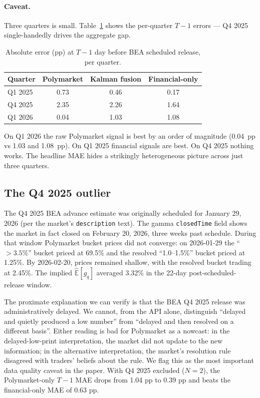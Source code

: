 \documentclass{article}
\begin{document}
\paragraph{Caveat.} Three quarters is small. Table~\ref{tab:per-q} shows the per-quarter
$T{-}1$ errors --- Q4 2025 single-handedly drives the aggregate gap.

\begin{table}[h!]
\centering
\caption{Absolute error (pp) at $T{-}1$ day before BEA scheduled release, per quarter.}
\label{tab:per-q}
\small
\begin{tabular}{lccc}
\toprule
Quarter & Polymarket & Kalman fusion & Financial-only \\
\midrule
Q1 2025 & 0.73 & 0.46 & 0.17 \\
Q4 2025 & 2.35 & 2.26 & 1.64 \\
Q1 2026 & 0.04 & 1.03 & 1.08 \\
\bottomrule
\end{tabular}
\end{table}

On Q1 2026 the raw Polymarket signal is best by an order of magnitude (0.04~pp vs 1.03 and
1.08~pp). On Q1 2025 financial signals are best. On Q4 2025 nothing works. The headline MAE
hides a strikingly heterogeneous picture across just three quarters.

\subsection{The Q4 2025 outlier}
\label{sec:results:q4}
The Q4 2025 BEA advance estimate was originally scheduled for January 29, 2026 (per the
market's \texttt{description} text). The gamma \texttt{closedTime} field shows the market
in fact closed on February 20, 2026, three weeks past schedule. During that window
Polymarket bucket prices did not converge: on 2026-01-29 the ``$>3.5\%$'' bucket priced at
69.5\% and the resolved ``1.0--1.5\%'' bucket priced at 1.25\%. By 2026-02-20, prices
remained shallow, with the resolved bucket trading at 2.45\%. The implied
$\widehat{\mathbb{E}}[g_q]$ averaged 3.32\% in the 22-day post-scheduled-release window.

The proximate explanation we can verify is that the BEA Q4 2025 release was administratively
delayed. We cannot, from the API alone, distinguish ``delayed and quietly produced a low
number'' from ``delayed and then resolved on a different basis''. Either reading is bad for
Polymarket as a nowcast: in the delayed-low-print interpretation, the market did not update
to the new information; in the alternative interpretation, the market's resolution rule
disagreed with traders' beliefs about the rule. We flag this as the most important data
quality caveat in the paper. With Q4 2025 excluded ($N=2$), the Polymarket-only $T{-}1$
MAE drops from 1.04 pp to 0.39 pp and beats the financial-only MAE of 0.63 pp.
\end{document}
